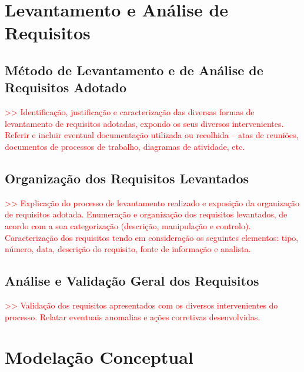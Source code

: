 \documentclass[a4paper,12pt]{scrreprt}
\begin{document}

\chapter{Levantamento e Análise de Requisitos}
    \section{Método de Levantamento e de Análise de Requisitos Adotado}
        \textcolor{red}{
            >> Identificação, justificação e caracterização das diversas formas de levantamento de requisitos adotadas, expondo os seus diversos intervenientes. Referir e incluir eventual documentação utilizada ou recolhida – atas de reuniões, documentos de processos de trabalho, diagramas de atividade, etc.
        }
    \section{Organização dos Requisitos Levantados}
        \textcolor{red}{
            >> Explicação do processo de levantamento realizado e exposição da organização de requisitos adotada. Enumeração e organização dos requisitos levantados, de acordo com a sua categorização (descrição, manipulação e controlo). Caracterização dos requisitos tendo em consideração os seguintes elementos: tipo, número, data, descrição do requisito, fonte de informação e analista.
        }
    \section{Análise e Validação Geral dos Requisitos}
        \textcolor{red}{
            >> Validação dos requisitos apresentados com os diversos intervenientes do processo. Relatar eventuais anomalias e ações corretivas desenvolvidas.
        }



\chapter{Modelação Conceptual}
\end{document}
